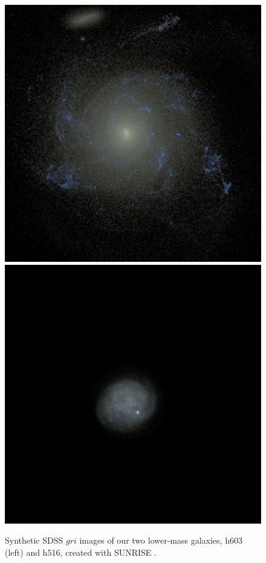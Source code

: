 \documentclass[a4paper,fleqn,usenatbib]{mnras}
\begin{document}
\begin{figure}
\includegraphics[width=\columnwidth]{Figures/dwarf1}
\includegraphics[width=\columnwidth]{Figures/h516}
\caption{\label{fig:GalaxyImages}Synthetic SDSS $gri$ images of our two lower-mass galaxies, h603 (left) and h516, created with \textsc{SUNRISE} \citep{Jonsson06}.
\label{fig:dwarfimages}
}
\end{figure}
\end{document}
